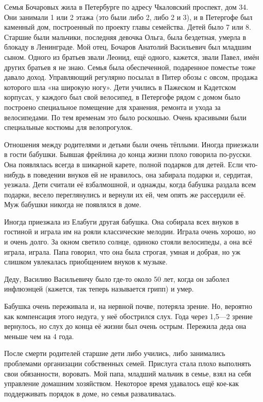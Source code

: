 Семья Бочаровых жила в Петербурге по адресу Чкаловский проспект, дом 34.
Они занимали 1 или 2 этажа (это были либо 2, либо 2 и 3), и в Петергофе был каменный дом, построенный по проекту главы семейства.
Детей было 7 или 8.
Старшие были мальчики, последняя девочка Ольга, была бездетная, умерла в блокаду в Ленинграде.
Мой отец, Бочаров Анатолий Васильевич был младшим сыном.
Одного из братьев звали Леонид,  ещё одного, кажется, звали Павел, имён других братьев я не знаю.
Семья была обеспеченной, подаренное поместье тоже давало доход.
Управляющий регулярно посылал в Питер обозы с овсом, продажа которого шла «на  широкую ногу».
Дети учились в Пажеском  и Кадетском корпусах, у каждого был свой велосипед, в Петергофе рядом с домом  было построено специальное помещение для хранения,  ремонта и ухода за велосипедами.
По тем временам это было роскошью.
Очень красивыми были специальные костюмы для велопрогулок.

Отношения  между родителями и детьми были очень тёплыми.
Иногда приезжали в гости бабушки.
Бывшая фрейлина до конца жизни плохо говорила по-русски.
Она  появлялась всегда в шикарной карете, полной подарков для детей.
Если что-нибудь в поведении внуков ей не нравилось, она забирала подарки и, сердитая, уезжала.
Дети считали её взбалмошной, и однажды, когда бабушка раздала всем подарки, весело переглянулись и вернули их ей, чем опять же рассердили её.
Муж бабушки никогда не появлялся в доме.

Иногда приезжала из Елабуги другая бабушка.
Она собирала всех внуков в гостиной и играла им на рояли классические мелодии.
Играла очень хорошо, но и очень долго.
За окном светило солнце, одиноко стояли велосипеды, а она всё играла, играла.
Папа говорил, что она была строгая, умная и добрая, но уж слишком  увлекалась приобщением внуков к музыке.

Деду, Василию Васильевичу было где-то около 50 лет, когда он заболел инфлюэнцей (кажется, так теперь называется грипп) и умер.

Бабушка очень переживала и, на нервной почве, потеряла зрение.
Но, вероятно как компенсация этого недуга, у неё обострился слух.
Года через 1,5---2 зрение вернулось, но слух до конца её жизни был очень острым.
Пережила деда она меньше чем на 4 года.

{\sloppy

После смерти родителей старшие дети либо учились, либо занимались проблемами организации собственных семей.
Прислуга стала плохо выполнять свои обязанности, воровать.
Мой папа, младший мальчик в семье, взял на себя управление домашним хозяйством.
Некоторое время удавалось ещё кое-как поддерживать порядок в доме, но семья разваливалась.

}

